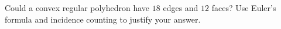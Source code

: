 Could a convex regular polyhedron have $18$ edges and $12$ faces? Use Euler's formula and incidence counting to justify your answer.
